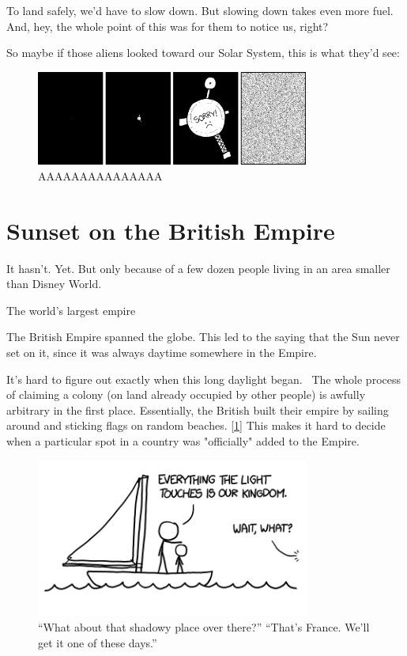 {{To land safely, we’d have to slow down. But slowing down takes even more fuel. And, hey, the whole point of this was for them to notice us, right?}

{So maybe if those aliens looked toward our Solar System, this is what they’d see:}

\begin{figure}[!htbp]
\centering
\includegraphics[scale=0.5, max width=0.8\textwidth]{imgs/a/47/life_sorry.png}
\caption{AAAAAAAAAAAAAAA}
\end{figure}

{
\chapter{Sunset on the British Empire}
}

\hfill{}

{It hasn't. Yet. But only because of a few dozen people living in an area smaller than Disney World.}

{The world's largest empire}

{The British Empire spanned the globe. This led to the saying that the Sun never set on it, since it was always daytime somewhere in the Empire.}

{It's hard to figure out exactly when this long daylight began.  The whole process of claiming a colony (on land already occupied by other people) is awfully arbitrary in the first place. Essentially, the British built their empire by sailing around and sticking flags on random beaches. \href{http://www.youtube.com/watch?v=uEx5G-GOS1k}{[1]} This makes it hard to decide when a particular spot in a country was "officially" added to the Empire.}

\begin{figure}[!htbp]
\centering
\includegraphics[scale=0.5, max width=0.8\textwidth]{imgs/a/48/empire_simba.png}
\caption{“What about that shadowy place over there?” “That’s France. We’ll get it one of these days.”}
\end{figure}

}
